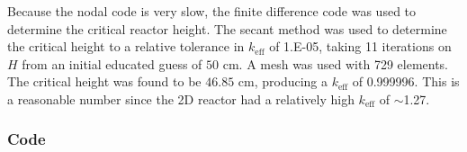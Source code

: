 \documentclass[12pt]{article}
\newcommand{\keff}{\ensuremath{k_{\mathrm{eff}}}}
\newenvironment{solnum}[2][Solution]{\begin{trivlist}
\item[\hskip \labelsep {\bfseries #1}\hskip \labelsep {\bfseries #2:}]\hspace{0.3in}\newline\newline}{\end{trivlist}}
\begin{document}
\clearpage

\begin{solnum}{1-3}

Because the nodal code is very slow, the finite difference code was used to determine
the critical reactor height. The secant method was used to determine the critical
height to a relative tolerance in $\keff$ of 1.E-05, taking 11 iterations on $H$
from an initial educated guess of $50$ cm.  A mesh was used with 729 elements. The
critical height was found to be  $46.85$ cm, producing a $\keff$ of 0.999996. This
is a reasonable number since the 2D reactor had a relatively high $\keff$ of
$\sim$1.27.
\end{solnum}

\clearpage

\clearpage
\subsubsection*{Code}

\end{document}
